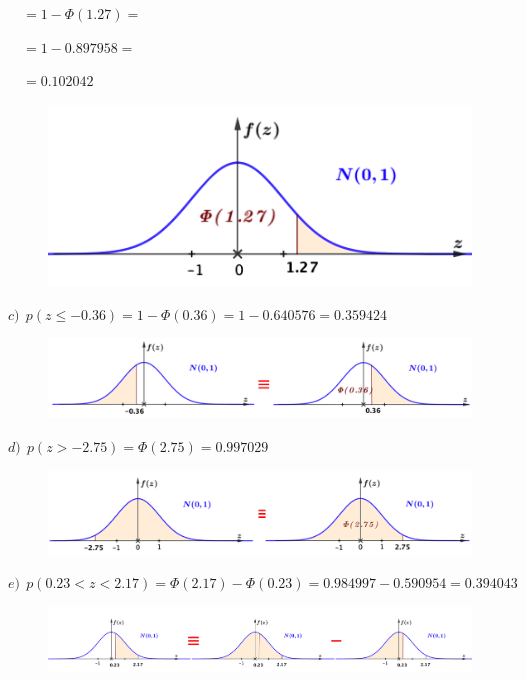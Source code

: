 \begin{ejemplo}
\begin{ejre}
\begin{multicols}{2}
 $\quad =1-\Phi(1.27)=$
 
 $\quad =1-0.897958=$
 
 $\quad =0.102042$
 
 \begin{figure}[H]
	\centering
	\includegraphics[width=.5\textwidth]{imagenes/imagenes04/T04IM19.png}
	\end{figure}
 	
 \end{multicols}
 

 $c)\ \ p(z\le -0.36)=1-\Phi(0.36)=1-0.640576=0.359424$
 
 
 \begin{figure}[H]
	\centering
	\includegraphics[width=1\textwidth]{imagenes/imagenes04/T04IM20.png}
	\end{figure}
 	

 
 $d)\ \ p(z>-2.75)=\Phi(2.75)=0.997029$
 
 \begin{figure}[H]
	\centering
	\includegraphics[width=1\textwidth]{imagenes/imagenes04/T04IM21.png}
	\end{figure}
 	
 $e)\ \ p(0.23<z<2.17)=\Phi(2.17)-\Phi(0.23)=0.984997-0.590954=0.394043$

 \begin{figure}[H]
	\centering
	\includegraphics[width=1\textwidth]{imagenes/imagenes04/T04IM22.png}
	\end{figure}
	

\end{ejre}
\end{ejemplo}
